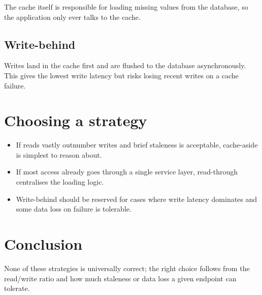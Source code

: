 \documentclass{lebhart}
\begin{document}
The cache itself is responsible for loading missing values from the
database, so the application only ever talks to the cache.

\subsection{Write-behind}

Writes land in the cache first and are flushed to the database
asynchronously. This gives the lowest write latency but risks losing
recent writes on a cache failure.

\section{Choosing a strategy}

\begin{itemize}
\item If reads vastly outnumber writes and brief staleness is
  acceptable, cache-aside is simplest to reason about.
\item If most access already goes through a single service layer,
  read-through centralises the loading logic.
\item Write-behind should be reserved for cases where write latency
  dominates and some data loss on failure is tolerable.
\end{itemize}

\section{Conclusion}

None of these strategies is universally correct; the right choice
follows from the read/write ratio and how much staleness or data loss
a given endpoint can tolerate.
\end{document}
